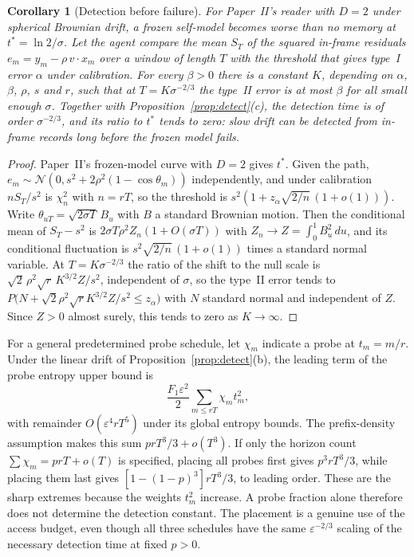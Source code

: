 \documentclass[12pt]{article}
\newtheorem{corollary}[theorem]{Corollary}
\theoremstyle{definition}
\begin{document}
\begin{corollary}[Detection before failure]
\label{cor:before_failure}
For Paper~II's reader with $D=2$ under spherical Brownian drift, a frozen self-model becomes worse than no memory at $t^*=\ln2/\sigma$. Let the agent compare the mean $S_T$ of the squared in-frame residuals $e_m=y_m-\rho\,v\cdot x_m$ over a window of length $T$ with the threshold that gives type~I error $\alpha$ under calibration. For every $\beta>0$ there is a constant $K$, depending on $\alpha$, $\beta$, $\rho$, $s$ and $r$, such that at $T=K\sigma^{-2/3}$ the type~II error is at most $\beta$ for all small enough $\sigma$. Together with Proposition~\ref{prop:detect}(c), the detection time is of order $\sigma^{-2/3}$, and its ratio to $t^*$ tends to zero: slow drift can be detected from in-frame records long before the frozen model fails.
\end{corollary}

\begin{proof}
Paper~II's frozen-model curve with $D=2$ gives $t^*$. Given the path, $e_m\sim\mathcal N(0,s^2+2\rho^2(1-\cos\theta_m))$ independently, and under calibration $nS_T/s^2$ is $\chi^2_n$ with $n=rT$, so the threshold is $s^2(1+z_\alpha\sqrt{2/n}\,(1+o(1)))$. Write $\theta_{uT}=\sqrt{2\sigma T}\,B_u$ with $B$ a standard Brownian motion. Then the conditional mean of $S_T-s^2$ is $2\sigma T\rho^2Z_n(1+O(\sigma T))$ with $Z_n\to Z=\int_0^1B_u^2\,du$, and its conditional fluctuation is $s^2\sqrt{2/n}\,(1+o(1))$ times a standard normal variable. At $T=K\sigma^{-2/3}$ the ratio of the shift to the null scale is $\sqrt2\,\rho^2\sqrt r\,K^{3/2}Z/s^2$, independent of $\sigma$, so the type~II error tends to $P\bigl(N+\sqrt2\rho^2\sqrt rK^{3/2}Z/s^2\le z_\alpha\bigr)$ with $N$ standard normal and independent of $Z$. Since $Z>0$ almost surely, this tends to zero as $K\to\infty$.
\end{proof}

For a general predetermined probe schedule, let $\chi_m$ indicate a probe
at $t_m=m/r$. Under the linear drift of
Proposition~\ref{prop:detect}(b), the leading term of the probe entropy upper bound is
\[
 \frac{F_1\varepsilon^2}{2}\sum_{m\le rT}\chi_m t_m^2,
\]
with remainder $O(\varepsilon^4 rT^5)$ under its global entropy bounds.
The prefix-density assumption makes this sum $p rT^3/3+o(T^3)$.
If only the horizon count $\sum\chi_m=p rT+o(T)$ is specified,
placing all probes first gives $p^3rT^3/3$, while placing them last gives
$[1-(1-p)^3]rT^3/3$, to leading order. These are the sharp extremes
because the weights $t_m^2$ increase. A probe fraction alone therefore
does not determine the detection constant. The placement is a genuine
use of the access budget, even though all three schedules have the
same $\varepsilon^{-2/3}$ scaling of the necessary detection time at fixed $p>0$.
\end{document}
